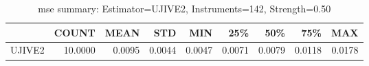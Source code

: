 \begin{table}[ht]
\centering
\caption{mse summary: Estimator=UJIVE2, Instruments=142, Strength=0.50}
\begin{tabular}{lrrrrrrrr}
\toprule
 & COUNT & MEAN & STD & MIN & 25\% & 50\% & 75\% & MAX \\
\midrule
UJIVE2 & 10.0000 & 0.0095 & 0.0044 & 0.0047 & 0.0071 & 0.0079 & 0.0118 & 0.0178 \\
\bottomrule
\end{tabular}
\end{table}
